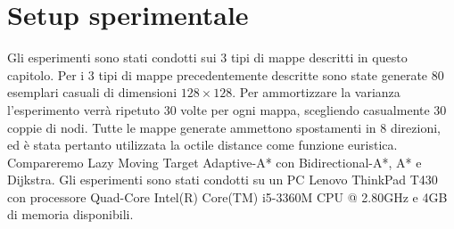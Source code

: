 \documentclass[12pt]{book}
\begin{document}
{

\section{Setup sperimentale}
\par{Gli esperimenti sono stati condotti sui 3 tipi di mappe descritti in questo capitolo. Per i 3 tipi di mappe precedentemente descritte sono state generate 80 esemplari casuali di dimensioni $128 \times 128$. Per ammortizzare la varianza l'esperimento verr\`a ripetuto 30 volte per ogni mappa, scegliendo casualmente 30 coppie di nodi. Tutte le mappe generate ammettono spostamenti in 8 direzioni, ed \`e stata pertanto utilizzata la octile distance come funzione euristica. Compareremo Lazy Moving Target Adaptive-A* con Bidirectional-A*, A* e Dijkstra. Gli esperimenti sono stati condotti su un PC Lenovo ThinkPad T430 con processore Quad-Core Intel(R) Core(TM) i5-3360M CPU @ 2.80GHz e 4GB di memoria disponibili.
  }
\iffalse
}
\end{document}
